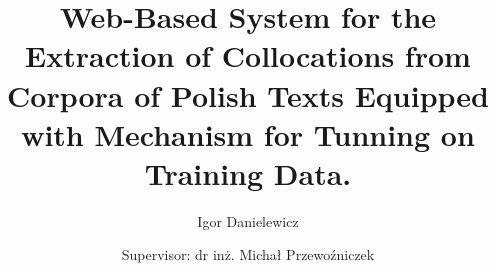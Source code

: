 \documentclass[12pt]{report}
\title{Web-Based System for the Extraction of Collocations from Corpora of Polish Texts Equipped with Mechanism for Tunning on Training Data.}
\author{Igor Danielewicz\\ \and Supervisor: dr inż. Michał Przewoźniczek}
\begin{document}
\begin{titlepage}
	
\end{titlepage}




\tableofcontents










        
        
        
\end{document}
